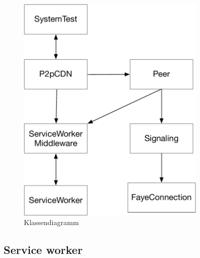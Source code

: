 \begin{figure}[!h]
	\centering
	\includegraphics[width=0.8\textwidth]{figures/Klassendiagramm}
	\caption[A Figure Short-Title]{Klassendiagramm}
	\label{fig:Klassendiagramm}
\end{figure}


\subsection{Service worker}

